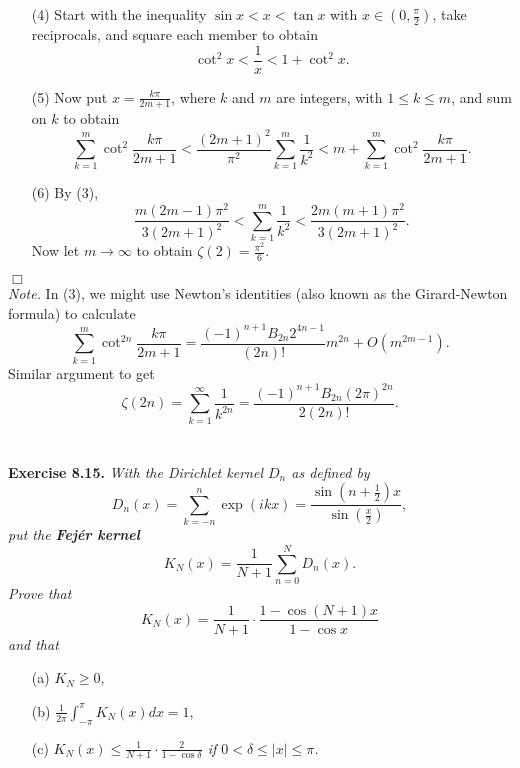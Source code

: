 \documentclass{article}
\begin{document}
\begin{enumerate}
  \item[(4)]
    Start with the inequality $\sin x < x < \tan x$ with $x \in (0, \frac{\pi}{2})$,
    take reciprocals, and square each member to obtain
    \[
      \cot^2 x < \frac{1}{x} < 1 + \cot^2 x.
    \]

  \item[(5)]
    Now put $x = \frac{k\pi}{2m+1}$, where $k$ and $m$ are integers, with $1 \leq k \leq m$,
    and sum on $k$ to obtain
    \[
      \sum_{k=1}^{m} \cot^2 \frac{k\pi}{2m+1}
      < \frac{(2m+1)^2}{\pi^2} \sum_{k=1}^{m} \frac{1}{k^2}
      < m + \sum_{k=1}^{m} \cot^2 \frac{k\pi}{2m+1}.
    \]

  \item[(6)]
    By (3),
    \[
      \frac{m(2m-1)\pi^2}{3(2m+1)^2}
      < \sum_{k=1}^{m} \frac{1}{k^2}
      < \frac{2m(m+1)\pi^2}{3(2m+1)^2}.
    \]
    Now let $m \to \infty$ to obtain $\zeta(2) = \frac{\pi^2}{6}$.
\end{enumerate}
$\Box$ \\

\emph{Note.}
In (3), we might use Newton's identities (also known as the Girard-Newton formula)
to calculate
\[
  \sum_{k=1}^m \cot^{2n} \frac{k\pi}{2m+1}
  = \frac{(-1)^{n+1}B_{2n}2^{4n-1}}{(2n)!} m^{2n} + O(m^{2m-1}).
\]
Similar argument to get
\[
  \zeta(2n)
  = \sum_{k = 1}^{\infty} \frac{1}{k^{2n}}
  = \frac{(-1)^{n+1} B_{2n} (2\pi)^{2n}}{2(2n)!}.
\] \\\\






\textbf{Exercise 8.15.}
\emph{With the Dirichlet kernel $D_n$ as defined by
\[
  D_n(x)
  = \sum_{k=-n}^{n} \exp(ikx)
  = \frac{\sin(n+\frac{1}{2})x}{\sin(\frac{x}{2})},
\]
put the \textbf{Fej\'er kernel}
\[
  K_N(x) = \frac{1}{N+1} \sum_{n=0}^{N} D_n(x).
\]
Prove that
\[
  K_N(x) = \frac{1}{N+1} \cdot \frac{1-\cos(N+1)x}{1-\cos x}
\]
and that}
\begin{enumerate}
  \item[(a)]
  $K_N \geq 0$,

  \item[(b)]
  $\frac{1}{2\pi} \int_{-\pi}^{\pi} K_N(x) dx = 1$,

  \item[(c)]
  \emph{$K_N(x) \leq \frac{1}{N+1} \cdot \frac{2}{1-\cos \delta}$
  if $0 < \delta \leq |x| \leq \pi$.}
\end{enumerate}
\end{document}
